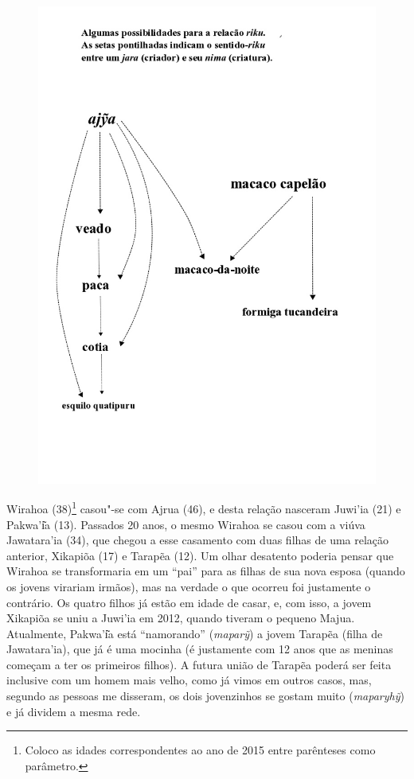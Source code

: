 \begin{figure}[H]
\centering
  \includegraphics[width=\textwidth]{./imgs/Figura_11}
\end{figure}

Wirahoa (38)\footnote{Coloco as idades correspondentes ao ano de 2015
  entre parênteses como parâmetro.} casou"-se com Ajrua (46), e desta
relação nasceram Juwi'ia (21) e Pakwa'i͂a (13). Passados 20 anos, o mesmo
Wirahoa se casou com a viúva Jawatara'ia (34), que chegou a esse
casamento com duas filhas de uma relação anterior, Xikapiõa (17) e
Tarapẽa (12). Um olhar desatento poderia pensar que Wirahoa se
transformaria em um ``pai'' para as filhas de sua nova esposa (quando os
jovens virariam irmãos), mas na verdade o que ocorreu foi justamente o
contrário. Os quatro filhos já estão em idade de casar, e, com isso, a
jovem Xikapiõa se uniu a Juwi'ia em 2012, quando tiveram o pequeno
Majua. Atualmente, Pakwa'i͂a está ``namorando'' (\emph{maparỹ}) a jovem
Tarapẽa (filha de Jawatara'ia), que já é uma mocinha (é justamente com
12 anos que as meninas começam a ter os primeiros filhos). A futura
união de Tarapẽa poderá ser feita inclusive com um homem mais velho,
como já vimos em outros casos, mas, segundo as pessoas me disseram, os
dois jovenzinhos se gostam muito (\emph{maparyhỹ}) e já dividem a mesma
rede.

